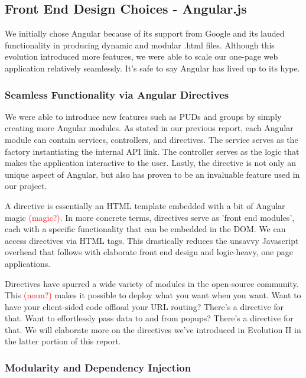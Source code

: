 \documentclass[a4paper]{article}
\newcommand{\comment}[1]{\textcolor{red}{#1}}
\begin{document}
\subsection{Front End Design Choices - Angular.js}

We initially chose Angular because of its support from Google and its lauded functionality in producing dynamic and modular .html files. Although this evolution introduced more features, we were able to scale our one-page web application relatively seamlessly. It's safe to say Angular has lived up to its hype.

\subsubsection{Seamless Functionality via Angular Directives}

We were able to introduce new features such as PUDs and groups by simply creating more Angular modules. As stated in our previous report, each Angular module can contain services, controllers, and directives. The service serves as the factory instantiating the internal API link. The controller serves as the logic that makes the application interactive to the user. Lastly, the directive is not only an unique aspect of Angular, but also has proven to be an invaluable feature used in our project. 

A directive is essentially an HTML template embedded with a bit of Angular magic \comment{(magic?)}. In more concrete terms, directives serve as 'front end modules', each with a specific functionality that can be embedded in the DOM. We can access directives via HTML tags. This drastically reduces the unsavvy Javascript overhead that follows with elaborate front end design and logic-heavy, one page applications.

Directives have spurred a wide variety of modules in the open-source community. This \comment{(noun?)} makes it possible to deploy what you want when you want. Want to have your client-sided code offload your URL routing? There's a directive for that. Want to effortlessly pass data to and from popups? There's a directive for that. We will elaborate more on the directives we've introduced in Evolution II in the latter portion of this report.

\subsubsection{Modularity and Dependency Injection}
\end{document}
